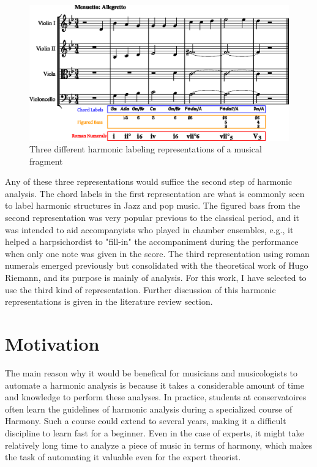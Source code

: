 \begin{figure}[h]
  \caption{Three different harmonic labeling representations of a musical fragment}
  \label{fig:harmonic-labels}
  \centering
    \includegraphics[width=1.0\textwidth]{01-introduction/figures/3}
\end{figure}

Any of these three representations would suffice the second step of harmonic analysis. The chord labels in the first representation are what is commonly seen to label harmonic structures in Jazz and pop music. The figured bass from the second representation was very popular previous to the classical period, and it was intended to aid accompanyists who played in chamber ensembles, e.g., it helped a harpsichordist to "fill-in" the accompaniment during the performance when only one note was given in the score. The third representation using roman numerals emerged previously but consolidated with the theoretical work of Hugo Riemann, and its purpose is mainly of analysis. For this work, I have selected to use the third kind of representation. Further discussion of this harmonic representations is given in the literature review section.

\section{Motivation}
The main reason why it would be benefical for musicians and musicologists to automate a harmonic analysis is because it takes a considerable amount of time and knowledge to perform these analyses. In practice, students at conservatoires often learn the guidelines of harmonic analysis during a specialized course of Harmony. Such a course could extend to several years, making it a difficult discipline to learn fast for a beginner. Even in the case of experts, it might take relatively long time to analyze a piece of music in terms of harmony, which makes the task of automating it valuable even for the expert theorist.

